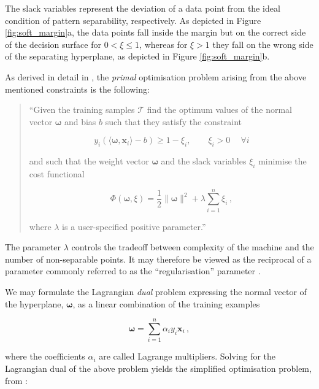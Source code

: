 \noindent
The slack variables represent the deviation of a data point from the ideal condition of pattern separability, respectively. As depicted in Figure \ref{fig:soft_margin}a, the data points fall inside the margin but on the correct side of the decision surface for $0 < \xi \leq 1$, whereas for $\xi > 1$ they fall on the wrong side of the separating hyperplane, as depicted in Figure \ref{fig:soft_margin}b.

As derived in detail in \cite{haykin2009neural}, the \emph{primal} optimisation problem arising from the above mentioned constraints is the following:

\begin{quote}

``Given the training samples $\mathcal{T}$ find the optimum values of the normal vector $\bm{\omega}$ and bias $b$ such that they satisfy the constraint

\begin{equation}
y_i (\langle \bm{\omega} , \bm{x}_i \rangle - b) \geq 1 - \xi_i, \quad \quad \xi_i > 0\ \quad  \forall i
\end{equation}

\noindent
and such that the weight vector $\bm{\omega}$ and the slack variables $\xi_i$ minimise the cost functional

\begin{equation}
\Phi(\bm{\omega}, \xi) = \frac{1}{2} \|\bm{\omega}\|^2 + \lambda \sum_{i=1}^n \xi_i \,,
\end{equation}

\noindent
where $\lambda$ is a user-specified positive parameter.''

\end{quote}

\noindent
The parameter $\lambda$ controls the tradeoff between complexity of the machine and the number of non-separable points. It may therefore be viewed as the reciprocal of a parameter commonly referred to as the ``regularisation'' parameter \cite{haykin2009neural}.

We may formulate the Lagrangian \emph{dual} problem expressing the normal vector of the hyperplane, $\bm{\omega}$, as a linear combination of the training examples

\begin{equation}
\bm{\omega} = \sum_{i=1}^n \alpha_i y_i \bm{x}_i \,,
\label{eq:linear_comb}
\end{equation}

\noindent
where the coefficients $\alpha_i$ are called Lagrange multipliers. Solving for the Lagrangian dual of the above problem yields the simplified optimisation problem, from \cite{haykin2009neural}:

